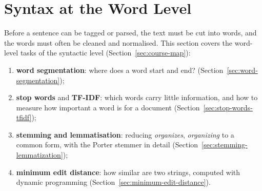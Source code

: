 \section{Syntax at the Word Level}
\label{sec:word-level-syntax}

Before a sentence can be tagged or parsed, the text must be cut into words, and the
words must often be cleaned and normalised. This section covers the word-level tasks of
the syntactic level (Section~\ref{sec:course-map}):
\begin{enumerate}[nosep]
  \item \textbf{word segmentation}: where does a word start and end?
        (Section~\ref{sec:word-segmentation});
  \item \textbf{stop words} and \textbf{TF-IDF}: which words carry little information,
        and how to measure how important a word is for a document
        (Section~\ref{sec:stop-words-tfidf});
  \item \textbf{stemming and lemmatisation}: reducing \emph{organizes},
        \emph{organizing} to a common form, with the Porter stemmer in detail
        (Section~\ref{sec:stemming-lemmatization});
  \item \textbf{minimum edit distance}: how similar are two strings, computed with
        dynamic programming (Section~\ref{sec:minimum-edit-distance}).
\end{enumerate}





